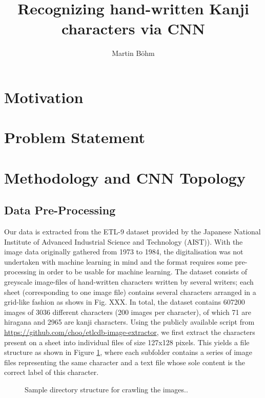 \documentclass[british,12p]{article}
\title{Recognizing hand-written Kanji characters via CNN}
\author{Martin Böhm}
\begin{document}
	\maketitle
    \begin{abstract}

           

    \end{abstract}
        
    \section{Motivation}
    
    \section{Problem Statement}
    \section{Methodology and CNN Topology}
    \subsection{Data Pre-Processing}\label{secPreProcess}
    Our data is extracted from the ETL-9 dataset provided by the Japanese National Institute of Advanced Industrial Science and Technology (AIST)). With the image data originally gathered from 1973 to 1984, the digitalisation was not undertaken with machine learning in mind and the format requires some pre-processing in order to be usable for machine learning. The dataset consists of greyscale image-files of hand-written characters written by several writers; each sheet (corresponding to one image file) contains several characters arranged in a grid-like fashion as shows in Fig. XXX. In total, the dataset contains 607200 images of 3036 different characters (200 images per character), of which 71 are hiragana and 2965 are kanji characters.
    	Using the publicly available script from \url{https://github.com/choo/etlcdb-image-extractor}, we first extract the characters present on a sheet into individual files of size 127x128 pixels. This yields a file structure as shown in Figure \ref{fig-directory-structure}, where each subfolder contains a series of image files representing the same character and a text file whose sole content is the correct label of this character.
    	
    	\begin{figure}[hbt]
			\begin{center}
  				\caption{Sample directory structure for crawling the images..}
  				\label{fig-directory-structure}
  			\end{center}
		\end{figure}
    	
\end{document}
